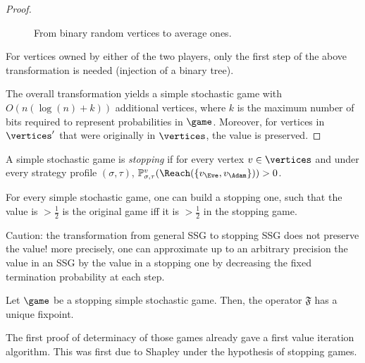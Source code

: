 \begin{proof}
\begin{figure}[htbp]
    \caption{From binary random vertices to average ones.}
    \label{6-fig:simul}
  \end{figure}

  
  For vertices owned by either of the two players, only the first step
  of the above transformation is needed (injection of a binary tree).

  The overall transformation yields a simple stochastic game with
  $O(n(\log(n)+k))$ additional vertices, where $k$ is the maximum
  number of bits required to represent probabilities in
  $\game$. Moreover, for vertices in $\vertices'$ that were originally
  in $\vertices$, the value is preserved.
\end{proof}


\begin{definition}
  A simple stochastic game is \emph{stopping} if for every vertex
  $v \in \vertices$ and under every  strategy profile
  $(\sigma,\tau)$, $\probm_{\sigma,\tau}^v(\Reach(\{v_\Eve,v_\Adam\})) >0$.
\end{definition}


\begin{theorem}
For every simple stochastic game, one can build a  stopping  one, such that the value is $> \frac{1}{2}$ is the original game iff it is $>\frac{1}{2}$ in the stopping game. 
\end{theorem}


Caution: the transformation from general SSG to stopping
SSG does not preserve the value! more precisely, one can approximate
up to an arbitrary precision the value in an SSG by the value in a
stopping one by decreasing the fixed termination probability at each step.

\begin{proposition}
  Let $\game$ be a stopping simple stochastic game. Then, the operator
  $\mathfrak{F}$ has a unique fixpoint.
\end{proposition}

The first proof of determinacy of those games already gave a first
value iteration algorithm. This was first due to Shapley under the
hypothesis of stopping games.

